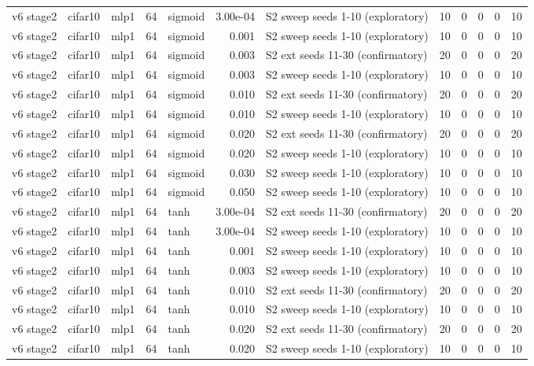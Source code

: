 \begin{table}[htbp]
{\begin{tabular}{@{}lllrlrlrrrrr@{}}
v6 stage2 & cifar10 & mlp1 & 64 & sigmoid & 3.00e-04 & S2 sweep seeds 1-10 (exploratory) & 10 & 0 & 0 & 0 & 10 \\
v6 stage2 & cifar10 & mlp1 & 64 & sigmoid & 0.001 & S2 sweep seeds 1-10 (exploratory) & 10 & 0 & 0 & 0 & 10 \\
v6 stage2 & cifar10 & mlp1 & 64 & sigmoid & 0.003 & S2 ext seeds 11-30 (confirmatory) & 20 & 0 & 0 & 0 & 20 \\
v6 stage2 & cifar10 & mlp1 & 64 & sigmoid & 0.003 & S2 sweep seeds 1-10 (exploratory) & 10 & 0 & 0 & 0 & 10 \\
v6 stage2 & cifar10 & mlp1 & 64 & sigmoid & 0.010 & S2 ext seeds 11-30 (confirmatory) & 20 & 0 & 0 & 0 & 20 \\
v6 stage2 & cifar10 & mlp1 & 64 & sigmoid & 0.010 & S2 sweep seeds 1-10 (exploratory) & 10 & 0 & 0 & 0 & 10 \\
v6 stage2 & cifar10 & mlp1 & 64 & sigmoid & 0.020 & S2 ext seeds 11-30 (confirmatory) & 20 & 0 & 0 & 0 & 20 \\
v6 stage2 & cifar10 & mlp1 & 64 & sigmoid & 0.020 & S2 sweep seeds 1-10 (exploratory) & 10 & 0 & 0 & 0 & 10 \\
v6 stage2 & cifar10 & mlp1 & 64 & sigmoid & 0.030 & S2 sweep seeds 1-10 (exploratory) & 10 & 0 & 0 & 0 & 10 \\
v6 stage2 & cifar10 & mlp1 & 64 & sigmoid & 0.050 & S2 sweep seeds 1-10 (exploratory) & 10 & 0 & 0 & 0 & 10 \\
v6 stage2 & cifar10 & mlp1 & 64 & tanh & 3.00e-04 & S2 ext seeds 11-30 (confirmatory) & 20 & 0 & 0 & 0 & 20 \\
v6 stage2 & cifar10 & mlp1 & 64 & tanh & 3.00e-04 & S2 sweep seeds 1-10 (exploratory) & 10 & 0 & 0 & 0 & 10 \\
v6 stage2 & cifar10 & mlp1 & 64 & tanh & 0.001 & S2 sweep seeds 1-10 (exploratory) & 10 & 0 & 0 & 0 & 10 \\
v6 stage2 & cifar10 & mlp1 & 64 & tanh & 0.003 & S2 sweep seeds 1-10 (exploratory) & 10 & 0 & 0 & 0 & 10 \\
v6 stage2 & cifar10 & mlp1 & 64 & tanh & 0.010 & S2 ext seeds 11-30 (confirmatory) & 20 & 0 & 0 & 0 & 20 \\
v6 stage2 & cifar10 & mlp1 & 64 & tanh & 0.010 & S2 sweep seeds 1-10 (exploratory) & 10 & 0 & 0 & 0 & 10 \\
v6 stage2 & cifar10 & mlp1 & 64 & tanh & 0.020 & S2 ext seeds 11-30 (confirmatory) & 20 & 0 & 0 & 0 & 20 \\
v6 stage2 & cifar10 & mlp1 & 64 & tanh & 0.020 & S2 sweep seeds 1-10 (exploratory) & 10 & 0 & 0 & 0 & 10 \\

\end{tabular}}
\end{table}
